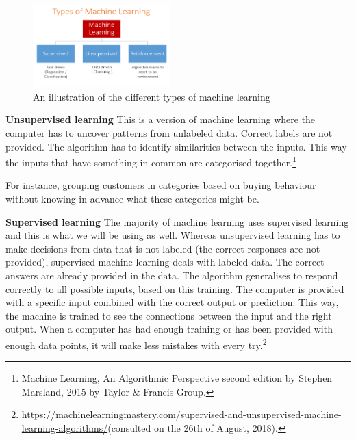 \documentclass[11pt]{article}
\begin{document}
\begin{figure}[htbp]
\centering
\includegraphics[width=200]{./typesmachinelearning.png}
\caption{\label{tab:types}
An illustration of the different types of machine learning}
\end{figure}


\textbf{Unsupervised learning}
This is a version of machine learning where the computer has to uncover patterns from unlabeled data. Correct labels are not provided. The algorithm has to identify similarities between the inputs. This way the inputs that have something in common are categorised together.\footnote{Machine Learning, An Algorithmic Perspective second edition by Stephen Marsland, 2015 by Taylor \& Francis Group.}

For instance, grouping customers in categories based on buying behaviour without knowing in advance what these categories might be. 

\textbf{Supervised learning}
The majority of machine learning uses supervised learning and this is what we will be using as well. Whereas unsupervised learning has to make decisions from data that is not labeled (the correct responses are not provided), supervised machine learning deals with labeled data. The correct answers are already provided in the data. The algorithm generalises to respond correctly to all possible inputs, based on this training. The computer is provided with a specific input combined with the correct output or prediction. This way, the machine is trained to see the connections between the input and the right output. When a computer has had enough training or has been provided with enough data points, it will make less mistakes with every try.\footnote{\url{https://machinelearningmastery.com/supervised-and-unsupervised-machine-learning-algorithms/}(consulted on the 26th of August, 2018).}
\end{document}
